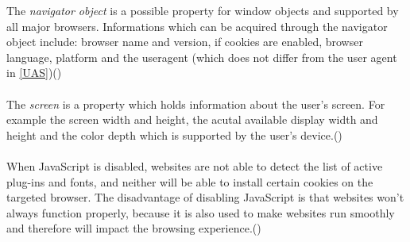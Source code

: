 The \textit{navigator object} is a possible property for window objects and supported by all major browsers. Informations which can be acquired through the navigator object include: browser name and version, if cookies are enabled, browser language, platform and the useragent (which does not differ from the user agent in \autoref{UAS})(\textcite{web17})\\\\
The \textit{screen} is a property which holds information about the user's screen. For example the screen width and height, the acutal available display width and height and the color depth which is supported by the user's device.(\textcite{web17})\\\\
When JavaScript is disabled, websites are not able to detect the list of active plug-ins and fonts, and neither will be able to install certain cookies on the targeted browser. The disadvantage of disabling JavaScript is that websites won’t always function properly, because it is also used to make websites run smoothly and therefore will impact the browsing experience.(\textcite{pixel18})


